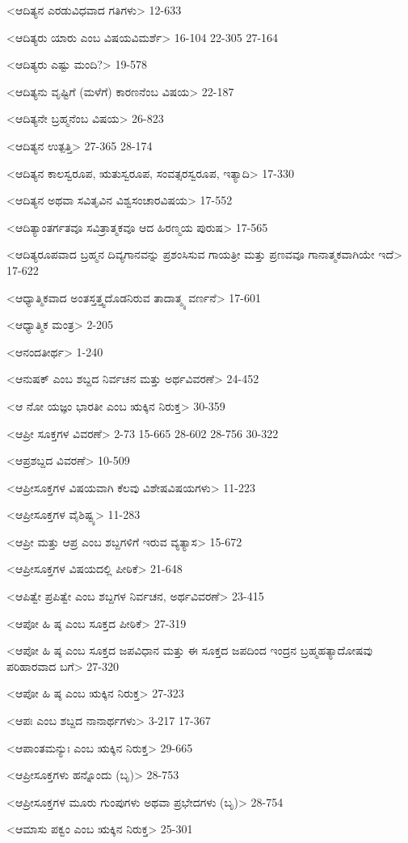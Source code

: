 <ಆದಿತ್ಯನ ಎರಡುವಿಧವಾದ ಗತಿಗಳು>
12-633

<ಆದಿತ್ಯರು ಯಾರು ಎಂಬ ವಿಷಯವಿಮರ್ಶೆ>
16-104 
22-305
27-164

<ಆದಿತ್ಯರು ಎಷ್ಟು ಮಂದಿ?>
19-578

<ಆದಿತ್ಯನು ವೃಷ್ಟಿಗೆ (ಮಳೆಗೆ) ಕಾರಣನೆಂಬ ವಿಷಯ>
22-187

<ಆದಿತ್ಯನೇ ಬ್ರಹ್ಮನೆಂಬ ವಿಷಯ>
26-823

<ಆದಿತ್ಯನ ಉತ್ಪತ್ತಿ>
27-365 
28-174

<ಆದಿತ್ಯನ ಕಾಲಸ್ವರೂಪ, ಋತುಸ್ವರೂಪ, ಸಂವತ್ಸರಸ್ವರೂಪ, ಇತ್ಯಾದಿ>
17-330

<ಆದಿತ್ಯನ ಅಥವಾ ಸವಿತೃವಿನ ವಿಶ್ವಸಂಚಾರವಿಷಯ>
17-552

<ಆದಿತ್ಯಾಂತರ್ಗತವೂ ಸವಿತ್ರಾತ್ಮಕವೂ ಆದ ಹಿರಣ್ಮಯ ಪುರುಷ>
17-565

<ಆದಿತ್ಯರೂಪವಾದ ಬ್ರಹ್ಮನ ದಿವ್ಯಗಾನವನ್ನು ಪ್ರಶಂಸಿಸುವ ಗಾಯತ್ರೀ ಮತ್ತು ಪ್ರಣವವೂ ಗಾನಾತ್ಮಕವಾಗಿಯೇ ಇದೆ>
17-622

<ಆಧ್ಯಾತ್ಮಿಕವಾದ ಅಂತಸ್ತತ್ತ್ವದೊಡನಿರುವ ತಾದಾತ್ಮ್ಯ ವರ್ಣನೆ>
17-601

<ಆಧ್ಯಾತ್ಮಿಕ ಮಂತ್ರ>
2-205

<ಆನಂದತೀರ್ಥ>
1-240

<ಆನುಷಕ್‍ ಎಂಬ ಶಬ್ದದ ನಿರ್ವಚನ ಮತ್ತು ಅರ್ಥವಿವರಣೆ>
24-452

<ಆ ನೋ ಯಜ್ಞಂ ಭಾರತೀ ಎಂಬ ಋಕ್ಕಿನ ನಿರುಕ್ತ>
30-359

<ಆಪ್ರೀ ಸೂಕ್ತಗಳ ವಿವರಣೆ>
2-73 
15-665 
28-602
28-756 
30-322

<ಆಪ್ರಶಬ್ದದ ವಿವರಣೆ>
10-509

<ಆಪ್ರೀಸೂಕ್ತಗಳ ವಿಷಯವಾಗಿ ಕೆಲವು ವಿಶೇಷವಿಷಯಗಳು>
11-223

<ಆಪ್ರೀಸೂಕ್ತಗಳ ವೈಶಿಷ್ಟ್ಯ>
11-283

<ಆಪ್ರೀ ಮತ್ತು ಆಪ್ರ ಎಂಬ ಶಬ್ದಗಳಿಗೆ ಇರುವ ವ್ಯತ್ಯಾಸ>
15-672

<ಆಪ್ರೀಸೂಕ್ತಗಳ ವಿಷಯದಲ್ಲಿ ಪೀಠಿಕೆ>
21-648

<ಆಪಿತ್ವೇ ಪ್ರಪಿತ್ವೇ ಎಂಬ ಶಬ್ದಗಳ ನಿರ್ವಚನ, ಅರ್ಥವಿವರಣೆ>
23-415

<ಆಪೋ ಹಿ ಷ್ಠ ಎಂಬ ಸೂಕ್ತದ ಪೀಠಿಕೆ>
27-319

<ಆಪೋ ಹಿ ಷ್ಠ ಎಂಬ ಸೂಕ್ತದ ಜಪವಿಧಾನ ಮತ್ತು ಈ ಸೂಕ್ತದ ಜಪದಿಂದ ಇಂದ್ರನ ಬ್ರಹ್ಮಹತ್ಯಾದೋಷವು ಪರಿಹಾರವಾದ ಬಗೆ>
27-320

<ಆಪೋ ಹಿ ಷ್ಠ ಎಂಬ ಋಕ್ಕಿನ ನಿರುಕ್ತ>
27-323

<ಆಪಃ ಎಂಬ ಶಬ್ದದ ನಾನಾರ್ಥಗಳು>
3-217
17-367

<ಆಪಾಂತಮನ್ಯುಃ ಎಂಬ ಋಕ್ಕಿನ ನಿರುಕ್ತ>
29-665

<ಆಪ್ರೀಸೂಕ್ತಗಳು ಹನ್ನೊಂದು (ಬೃ)>
28-753

<ಆಪ್ರೀಸೂಕ್ತಗಳ ಮೂರು ಗುಂಪುಗಳು ಅಥವಾ ಪ್ರಭೇದಗಳು (ಬೃ)>
28-754

<ಆಮಾಸು ಪಕ್ವಂ ಎಂಬ ಋಕ್ಕಿನ ನಿರುಕ್ತ>
25-301

